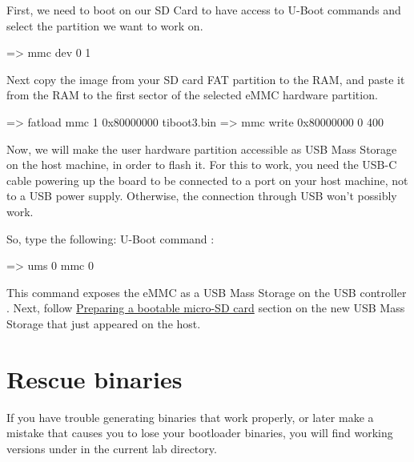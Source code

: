 First, we need to boot on our SD Card to have access to U-Boot commands and
select the  partition we want to work on.

\begin{ubootinput}
  => mmc dev 0 1
\end{ubootinput}

Next copy the  image from your SD card FAT partition to the RAM,
and paste it from the RAM to the first sector of the selected eMMC hardware
partition.

\begin{ubootinput}
  => fatload mmc 1 0x80000000 tiboot3.bin
  => mmc write 0x80000000 0 400
\end{ubootinput}

Now, we will make the user hardware partition accessible as USB Mass Storage on
the host machine, in order to flash it. For this to work, you need the USB-C
cable powering up the board to be connected to a port on your host machine, not
to a USB power supply. Otherwise, the connection through USB won't possibly
work.

So, type the following:
 U-Boot command :
\begin{ubootinput}
  => ums 0 mmc 0
\end{ubootinput}
This command exposes the eMMC  as a USB Mass Storage on the USB
controller .
Next, follow \hyperref[sec:Prepboot]{Preparing a bootable micro-SD card} section
on the new USB Mass Storage that just appeared on the host.

\section{Rescue binaries}

If you have trouble generating binaries that work properly, or later
make a mistake that causes you to lose your bootloader binaries, you
will find working versions under  in the current lab
directory.
